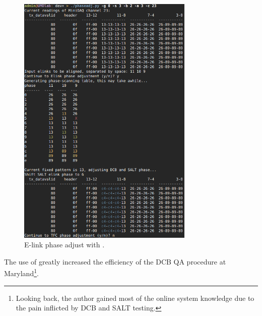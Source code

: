 \begin{figure}[!htb]
    \centering
    \includegraphics[width=0.75\textwidth]{./figs-ut-upgrade/online/elk_phase_adj.png}
    \caption{
        E-link phase adjust with \nanoDAQ.
    }
    \label{fig:nanodaq-phaseadj}
\end{figure}

The use of \nanoDAQ greatly increased the efficiency of the DCB QA procedure
at Maryland\footnote{
    Looking back, the author gained most of the online system knowledge due to
    the pain inflicted by DCB and SALT testing.
}.
